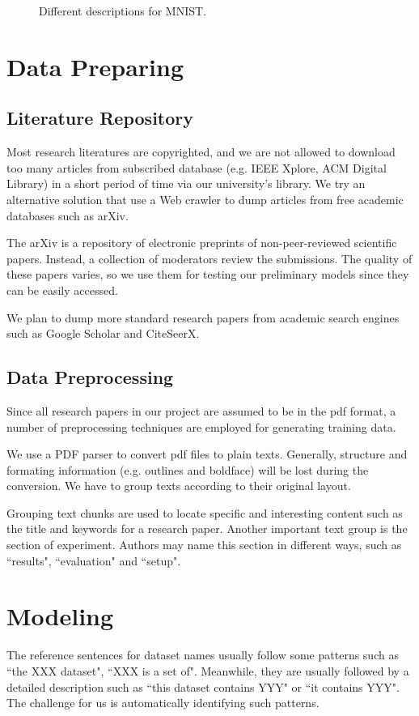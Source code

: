 \documentclass[fleqn]{article}
\begin{document}
\begin{figure}[htbp]
{{  }
}
\caption{Different descriptions for MNIST.}
\label{fig:e}
\end{figure}

\section{Data Preparing}
\subsection{Literature Repository}
Most research literatures are copyrighted, and we are not allowed to download too many articles from subscribed database (e.g. IEEE Xplore, ACM Digital Library) in a short period of time via our university's library. We try an alternative solution that use a Web crawler to dump articles from free academic databases such as arXiv.

The arXiv is a repository of electronic preprints of non-peer-reviewed scientific papers. Instead, a collection of moderators review the submissions. The quality of these papers varies, so we use them for testing our preliminary models since they can be easily accessed.

We plan to dump more standard research papers from academic search engines such as Google Scholar and CiteSeerX.

\subsection{Data Preprocessing}
Since all research papers in our project are assumed to be in the pdf format, a number of preprocessing techniques are employed for generating training data.

We use a PDF parser to convert pdf files to plain texts. Generally, structure and formating information (e.g. outlines and boldface) will be lost during the conversion. We have to group texts according to their original layout.

Grouping text chunks are used to locate specific and interesting content such as the title and keywords for a research paper. Another important text group is the section of experiment. Authors may name this section in different ways, such as ``results", ``evaluation" and ``setup".

\section{Modeling}
The reference sentences for dataset names usually follow some patterns such as ``the XXX dataset", ``XXX is a set of". Meanwhile, they are usually followed by a detailed description such as ``this dataset contains YYY" or ``it contains YYY". The challenge for us is automatically identifying such patterns. 
\end{document}
